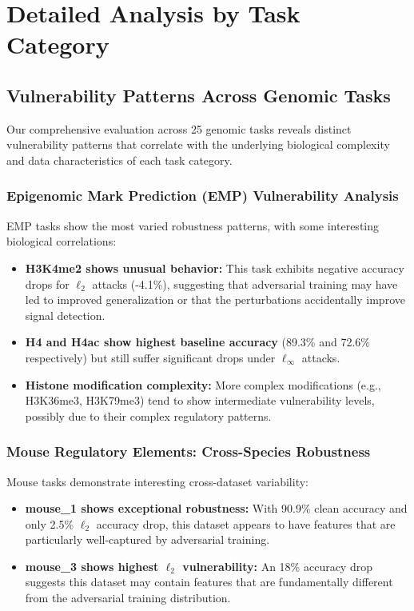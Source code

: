 \documentclass{article} %
\begin{document}
\section{Detailed Analysis by Task Category}

\subsection{Vulnerability Patterns Across Genomic Tasks}

Our comprehensive evaluation across 25 genomic tasks reveals distinct vulnerability patterns that correlate with the underlying biological complexity and data characteristics of each task category.

\subsubsection{Epigenomic Mark Prediction (EMP) Vulnerability Analysis}

EMP tasks show the most varied robustness patterns, with some interesting biological correlations:
\begin{itemize}
    \item \textbf{H3K4me2 shows unusual behavior:} This task exhibits negative accuracy drops for $\ell_2$ attacks (-4.1\%), suggesting that adversarial training may have led to improved generalization or that the perturbations accidentally improve signal detection.
    \item \textbf{H4 and H4ac show highest baseline accuracy} (89.3\% and 72.6\% respectively) but still suffer significant drops under $\ell_\infty$ attacks.
    \item \textbf{Histone modification complexity:} More complex modifications (e.g., H3K36me3, H3K79me3) tend to show intermediate vulnerability levels, possibly due to their complex regulatory patterns.
\end{itemize}

\subsubsection{Mouse Regulatory Elements: Cross-Species Robustness}

Mouse tasks demonstrate interesting cross-dataset variability:
\begin{itemize}
    \item \textbf{mouse\_1 shows exceptional robustness:} With 90.9\% clean accuracy and only 2.5\% $\ell_2$ accuracy drop, this dataset appears to have features that are particularly well-captured by adversarial training.
    \item \textbf{mouse\_3 shows highest $\ell_2$ vulnerability:} An 18\% accuracy drop suggests this dataset may contain features that are fundamentally different from the adversarial training distribution.
\end{itemize}
\end{document}
